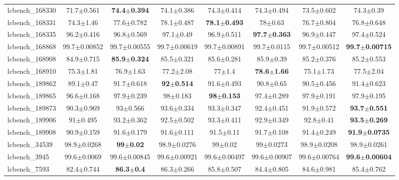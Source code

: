 \begin{table}[t]
\begin{center}
\begin{tabular}{lccccccc}
lcbench\_168330 & 71.7$\pm$0.561 & \textbf{74.4$\pm$0.394} & 74.1$\pm$0.386 & 74.3$\pm$0.414 & 74.3$\pm$0.494 & 73.5$\pm$0.602 & 74.3$\pm$0.39 \\
lcbench\_168331 & 74.3$\pm$1.46 & 77.6$\pm$0.782 & 78.1$\pm$0.487 & \textbf{78.1$\pm$0.493} & 78$\pm$0.63 & 76.7$\pm$0.804 & 76.8$\pm$0.648 \\
lcbench\_168335 & 96.2$\pm$0.416 & 96.8$\pm$0.569 & 97.1$\pm$0.49 & 96.9$\pm$0.511 & \textbf{97.7$\pm$0.363} & 96.9$\pm$0.447 & 97.4$\pm$0.524 \\
lcbench\_168868 & 99.7$\pm$0.00852 & 99.7$\pm$0.00555 & 99.7$\pm$0.00619 & 99.7$\pm$0.00891 & 99.7$\pm$0.0115 & 99.7$\pm$0.00512 & \textbf{99.7$\pm$0.00715} \\
lcbench\_168908 & 84.9$\pm$0.715 & \textbf{85.9$\pm$0.324} & 85.5$\pm$0.321 & 85.6$\pm$0.281 & 85.9$\pm$0.39 & 85.2$\pm$0.376 & 85.2$\pm$0.553 \\
lcbench\_168910 & 75.3$\pm$1.81 & 76.9$\pm$1.63 & 77.2$\pm$2.08 & 77$\pm$1.4 & \textbf{78.6$\pm$1.66} & 75.1$\pm$1.73 & 77.5$\pm$2.04 \\
lcbench\_189862 & 89.1$\pm$0.47 & 91.7$\pm$0.618 & \textbf{92$\pm$0.514} & 91.6$\pm$0.493 & 90.8$\pm$0.65 & 90.5$\pm$0.456 & 91.4$\pm$0.623 \\
lcbench\_189865 & 96.6$\pm$0.168 & 97.9$\pm$0.239 & 98$\pm$0.183 & \textbf{98$\pm$0.153} & 97.4$\pm$0.289 & 97.9$\pm$0.191 & 97.9$\pm$0.195 \\
lcbench\_189873 & 90.3$\pm$0.969 & 93$\pm$0.566 & 93.6$\pm$0.334 & 93.3$\pm$0.347 & 92.4$\pm$0.451 & 91.9$\pm$0.572 & \textbf{93.7$\pm$0.551} \\
lcbench\_189906 & 91$\pm$0.495 & 93.2$\pm$0.362 & 92.5$\pm$0.502 & 93.3$\pm$0.411 & 92.9$\pm$0.349 & 92.8$\pm$0.41 & \textbf{93.5$\pm$0.269} \\
lcbench\_189908 & 90.9$\pm$0.159 & 91.6$\pm$0.179 & 91.6$\pm$0.111 & 91.5$\pm$0.11 & 91.7$\pm$0.108 & 91.4$\pm$0.249 & \textbf{91.9$\pm$0.0735} \\
lcbench\_34539 & 98.9$\pm$0.0268 & \textbf{99$\pm$0.02} & 98.9$\pm$0.0276 & 99$\pm$0.02 & 99$\pm$0.0273 & 98.9$\pm$0.0208 & 98.9$\pm$0.0261 \\
lcbench\_3945 & 99.6$\pm$0.0069 & 99.6$\pm$0.00845 & 99.6$\pm$0.00921 & 99.6$\pm$0.00497 & 99.6$\pm$0.00907 & 99.6$\pm$0.00764 & \textbf{99.6$\pm$0.00604} \\
lcbench\_7593 & 82.4$\pm$0.744 & \textbf{86.3$\pm$0.4} & 86.3$\pm$0.266 & 85.8$\pm$0.507 & 84.4$\pm$0.805 & 84.6$\pm$0.981 & 85.4$\pm$0.762 \\
\hline
\end{tabular}
\end{center}
\end{table}